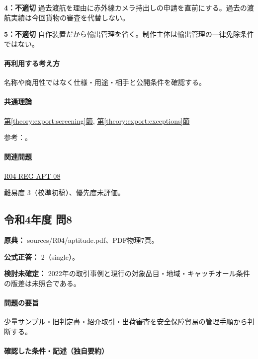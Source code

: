 \noindent\textbf{4：不適切} 過去渡航を理由に赤外線カメラ持出しの申請を直前にする。過去の渡航実績は今回貨物の審査を代替しない。\par

\noindent\textbf{5：不適切} 自作装置だから輸出管理を省く。制作主体は輸出管理の一律免除条件ではない。\par

\paragraph{再利用する考え方} 名称や商用性ではなく仕様・用途・相手と公開条件を確認する。

\paragraph{共通理論} \hyperref[theory:export:screening]{第\ref*{theory:export:screening}節}, \hyperref[theory:export:exceptions]{第\ref*{theory:export:exceptions}節}

\par 参考：\cite{export_overview,export_cases}。

\paragraph{関連問題} \hyperref[q:r04-reg-apt-08]{R04-REG-APT-08}

\par 難易度 3（校準初稿）、優先度未評価。

\subsection{令和4年度 問8}
\label{q:r04-reg-apt-08}

\noindent\textbf{原典：} sources/R04/aptitude.pdf、PDF物理7頁。

\textbf{公式正答：} 2（single）。

\par\textbf{検討未確定：} 2022年の取引事例と現行の対象品目・地域・キャッチオール条件の版差は未照合である。

\paragraph{問題の要旨} 少量サンプル・旧判定書・紹介取引・出荷審査を安全保障貿易の管理手順から判断する。

\paragraph{確認した条件・記述（独自要約）}\mbox{}\par

